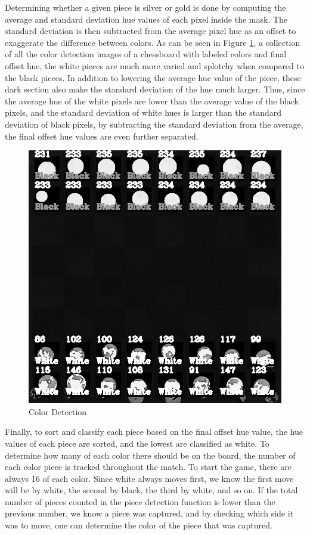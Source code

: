 \documentclass[journal]{IEEEtran}
\begin{document}
Determining whether a given piece is silver or gold is done by computing the average and standard deviation hue values of each pixel inside the mask. The standard deviation is then subtracted from the average pixel hue as an offset to exaggerate the difference between colors. As can be seen in Figure \ref{color}, a collection of all the color detection images of a chessboard with labeled colors and final offset hue, the white pieces are much more varied and splotchy when compared to the black pieces. In addition to lowering the average hue value of the piece, these dark section also make the standard deviation of the hue much larger. Thus, since the average hue of the white pixels are lower than the average value of the black pixels, and the standard deviation of white hues is larger than the standard deviation of black pixels, by subtracting the standard deviation from the average, the final offset hue values are even further separated.

\begin{figure}[!ht]
	\centering
	\includegraphics[width=\linewidth]{Images/ColorDetection.jpg}
	\caption{Color Detection}
	\label{color}
\end{figure}

Finally, to sort and classify each piece based on the final offset hue value, the hue values of each piece are sorted, and the lowest are classified as white. To determine how many of each color there should be on the board, the number of each color piece is tracked throughout the match. To start the game, there are always 16 of each color. Since white always moves first, we know the first move will be by white, the second by black, the third by white, and so on. If the total number of pieces counted in the piece detection function is lower than the previous number, we know a piece was captured, and by checking which side it was to move, one can determine the color of the piece that was captured.
\end{document}
